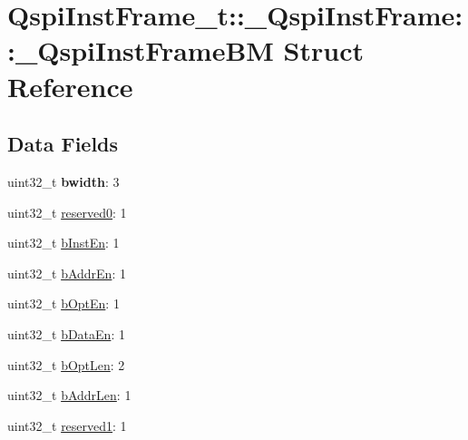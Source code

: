 \hypertarget{structQspiInstFrame__t_1_1__QspiInstFrame_1_1__QspiInstFrameBM}{}\section{Qspi\+Inst\+Frame\+\_\+t\+::\+\_\+\+Qspi\+Inst\+Frame\+::\+\_\+\+Qspi\+Inst\+Frame\+BM Struct Reference}
\label{structQspiInstFrame__t_1_1__QspiInstFrame_1_1__QspiInstFrameBM}
\subsection*{Data Fields}
\begin{DoxyCompactItemize}
\item 
\mbox{\label{structQspiInstFrame__t_1_1__QspiInstFrame_1_1__QspiInstFrameBM_a7481ea099e098294cfeeca4d15292e1c}} 
uint32\+\_\+t {\bfseries bwidth}\+: 3
\item 
uint32\+\_\+t \mbox{\hyperlink{structQspiInstFrame__t_1_1__QspiInstFrame_1_1__QspiInstFrameBM_aec30393107dfcda3876a44d8586e0655}{reserved0}}\+: 1
\item 
uint32\+\_\+t \mbox{\hyperlink{structQspiInstFrame__t_1_1__QspiInstFrame_1_1__QspiInstFrameBM_aa5fa4404f5dab3f8faf2fa24adff7d7c}{b\+Inst\+En}}\+: 1
\item 
uint32\+\_\+t \mbox{\hyperlink{structQspiInstFrame__t_1_1__QspiInstFrame_1_1__QspiInstFrameBM_af300ab76db59cc1191f2791de1b6f87a}{b\+Addr\+En}}\+: 1
\item 
uint32\+\_\+t \mbox{\hyperlink{structQspiInstFrame__t_1_1__QspiInstFrame_1_1__QspiInstFrameBM_a22e9b38acfffd19b0720f53d29927eab}{b\+Opt\+En}}\+: 1
\item 
uint32\+\_\+t \mbox{\hyperlink{structQspiInstFrame__t_1_1__QspiInstFrame_1_1__QspiInstFrameBM_aea7cd6c2d56980a789222e9b3c74b42b}{b\+Data\+En}}\+: 1
\item 
uint32\+\_\+t \mbox{\hyperlink{structQspiInstFrame__t_1_1__QspiInstFrame_1_1__QspiInstFrameBM_addfa7730302fba7093b11c12470adbec}{b\+Opt\+Len}}\+: 2
\item 
uint32\+\_\+t \mbox{\hyperlink{structQspiInstFrame__t_1_1__QspiInstFrame_1_1__QspiInstFrameBM_a0c85f37fb4a4fb8010920063c82eb24b}{b\+Addr\+Len}}\+: 1
\item 
uint32\+\_\+t \mbox{\hyperlink{structQspiInstFrame__t_1_1__QspiInstFrame_1_1__QspiInstFrameBM_a935babc895d4284569fe408f399c7c80}{reserved1}}\+: 1

\end{DoxyCompactItemize}
